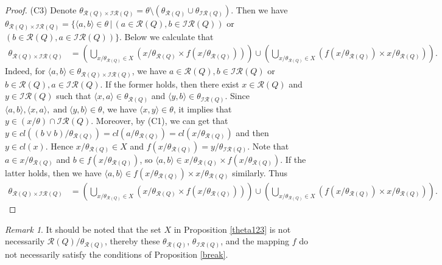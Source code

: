 \documentclass[12pt]{amsart}
\theoremstyle{definition}
\theoremstyle{remark}
\newtheorem{remark}{Remark}[section]
\numberwithin{equation}{section}
\begin{document}
\begin{proof}
(C3) Denote $\theta_{\mathscr{R}(Q)\times \mathscr{IR}(Q)}=\theta\setminus (\theta_{\mathscr{R}(Q)}\cup\theta_{\mathscr{IR}(Q)})$.
Then we have $\theta_{\mathscr{R}(Q)\times \mathscr{IR}(Q)}=\{\langle a,b\rangle\in \theta\,|\,(a\in \mathscr{R}(Q),b\in \mathscr{IR}(Q))$ or $(b\in \mathscr{R}(Q),a\in \mathscr{IR}(Q))\}$. Below we calculate that
\begin{align}
     \theta_{\mathscr{R}(Q)\times \mathscr{IR}(Q)}&=(\bigcup_{x/\theta_{\mathscr{R}(Q)}\in X}(x/\theta_{\mathscr{R}(Q)}\times f(x/\theta_{\mathscr{R}(Q)})))\cup (\bigcup_{x/\theta_{\mathscr{R}(Q)}\in X}(f(x/\theta_{\mathscr{R}(Q)}) \times x/\theta_{\mathscr{R}(Q)} )).\nonumber
\end{align}
Indeed, for $\langle a,b\rangle\in \theta_{\mathscr{R}(Q)\times \mathscr{IR}(Q)}$, we have $a\in \mathscr{R}(Q),b\in \mathscr{IR}(Q)$ or $b\in \mathscr{R}(Q),a\in \mathscr{IR}(Q)$. If the former holds, then there exist $x\in\mathscr{R}(Q)$ and $y\in\mathscr{IR}(Q)$ such that $\langle x,a\rangle\in \theta_{\mathscr{R}(Q)}$ and $\langle y,b\rangle\in \theta_{\mathscr{IR}(Q)}$. Since $\langle a,b\rangle, \langle x,a\rangle, \;\mathrm{and}\;\langle y,b\rangle \in \theta$, we have $\langle x,y\rangle\in \theta$, it implies that $y\in (x/\theta)\cap \mathscr{IR}(Q)$. Moreover, by (C1), we can get that $y\in cl((b\vee b)/\theta_{\mathscr{R}(Q)})=cl(a/\theta_{\mathscr{R}(Q)})=cl(x/\theta_{\mathscr{R}(Q)})$ and then $y\in cl(x)$. Hence $x/\theta_{\mathscr{R}(Q)}\in X$ and $f(x/\theta_{\mathscr{R}(Q)})=y/\theta_{\mathscr{IR}(Q)}$. Note that $a\in x/\theta_{\mathscr{R}(Q)}$ and $b\in f(x/\theta_{\mathscr{R}(Q)})$, so $\langle a,b\rangle\in x/\theta_{\mathscr{R}(Q)}\times f(x/\theta_{\mathscr{R}(Q)})$. If the latter holds, then we have $\langle a,b\rangle\in f(x/\theta_{\mathscr{R}(Q)}) \times x/\theta_{\mathscr{R}(Q)}$ similarly. Thus  \begin{align}
     \theta_{\mathscr{R}(Q)\times \mathscr{IR}(Q)}&=(\bigcup_{x/\theta_{\mathscr{R}(Q)}\in X}(x/\theta_{\mathscr{R}(Q)}\times f(x/\theta_{\mathscr{R}(Q)})))\cup (\bigcup_{x/\theta_{\mathscr{R}(Q)}\in X}(f(x/\theta_{\mathscr{R}(Q)}) \times x/\theta_{\mathscr{R}(Q)} )).\nonumber
\end{align}
\end{proof}

\begin{remark}
It should be noted that the set $X$ in Proposition \ref{theta123} is not necessarily $\mathscr{R}(Q)/\theta_{\mathscr{R}(Q)}$,
thereby these $\theta_{\mathscr{R}(Q)}$, $\theta_{\mathscr{IR}(Q)}$, and the mapping $f$  do not necessarily satisfy the conditions of Proposition  \ref{break}.

\end{remark}
\end{document}
